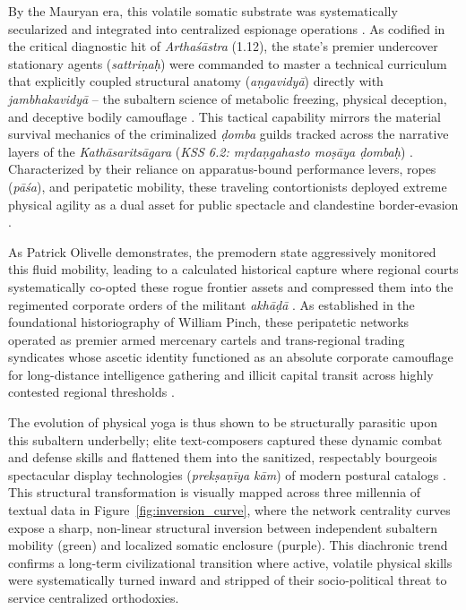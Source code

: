 \documentclass[11pt,twoside,letterpaper]{article}
\begin{document}
By the Mauryan era, this volatile somatic substrate was systematically secularized and integrated into centralized espionage operations \citep{McCartney2026}. As codified in the critical diagnostic hit of \textit{Artha\'s\={a}stra} (1.12), the state’s premier undercover stationary agents (\textit{sattri\d{n}a\d{h}}) were commanded to master a technical curriculum that explicitly coupled structural anatomy (\textit{a\d{n}gavidy\={a}}) directly with \textit{jambhakavidy\={a}} – the subaltern science of metabolic freezing, physical deception, and deceptive bodily camouflage \citep{McCartney2026}. This tactical capability mirrors the material survival mechanics of the criminalized \textit{\d{d}omba} guilds tracked across the narrative layers of the \textit{Kath\={a}sarits\={a}gara} (\textit{KSS 6.2: m\d{r}da\d{n}gahasto mo\d{s}\={a}ya \d{d}omba\d{h}}) \citep{McCartneyForthcomingDomingB}. Characterized by their reliance on apparatus-bound performance levers, ropes (\textit{p\={a}\'sa}), and peripatetic mobility, these traveling contortionists deployed extreme physical agility as a dual asset for public spectacle and clandestine border-evasion \citep{McCartney2026, McCartneyForthcomingDomingB}.

As Patrick Olivelle demonstrates, the premodern state aggressively monitored this fluid mobility, leading to a calculated historical capture where regional courts systematically co-opted these rogue frontier assets and compressed them into the regimented corporate orders of the militant \textit{akh\={a}\d{d}\={a}} \citep{Clark2006, Olivelle1987}. As established in the foundational historiography of William Pinch, these peripatetic networks operated as premier armed mercenary cartels and trans-regional trading syndicates whose ascetic identity functioned as an absolute corporate camouflage for long-distance intelligence gathering and illicit capital transit across highly contested regional thresholds \citep{Pinch1996, Pinch2012}. 

The evolution of physical yoga is thus shown to be structurally parasitic upon this subaltern underbelly; elite text-composers captured these dynamic combat and defense skills and flattened them into the sanitized, respectably bourgeois spectacular display technologies (\textit{prek\d{s}a\d{n}\={i}ya k\={a}m}) of modern postural catalogs \citep{Birch2024, Danta2015}. This structural transformation is visually mapped across three millennia of textual data in Figure~\ref{fig:inversion_curve}, where the network centrality curves expose a sharp, non-linear structural inversion between independent subaltern mobility (green) and localized somatic enclosure (purple). This diachronic trend confirms a long-term civilizational transition where active, volatile physical skills were systematically turned inward and stripped of their socio-political threat to service centralized orthodoxies.
\end{document}
